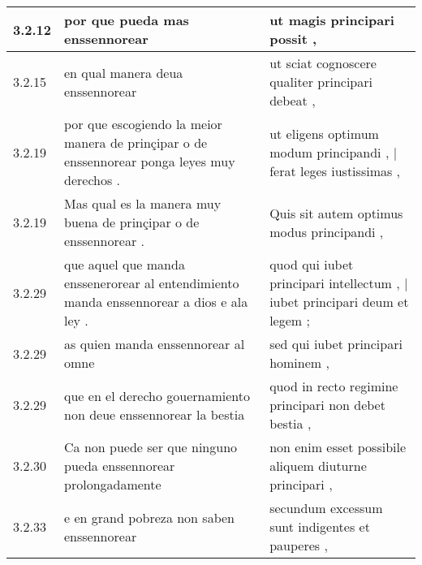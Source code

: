 \begin{tabular}{|p{1cm}|p{6.5cm}|p{6.5cm}|}
3.2.12 & por que pueda mas enssennorear & ut magis principari possit , \\\hline
3.2.15 & en qual manera deua enssennorear & ut sciat cognoscere qualiter principari debeat , \\\hline
3.2.19 & por que escogiendo la meior manera de prinçipar o de enssennorear ponga leyes muy derechos . & ut eligens optimum modum principandi , | ferat leges iustissimas , \\\hline
3.2.19 & Mas qual es la manera muy buena de prinçipar o de enssennorear . & Quis sit autem optimus modus principandi , \\\hline
3.2.29 & que aquel que manda enssenerorear al entendimiento manda enssennorear a dios e ala ley . & quod qui iubet principari intellectum , | iubet principari deum et legem ; \\\hline
3.2.29 & as quien manda enssennorear al omne & sed qui iubet principari hominem , \\\hline
3.2.29 & que en el derecho gouernamiento non deue enssennorear la bestia & quod in recto regimine principari non debet bestia , \\\hline
3.2.30 & Ca non puede ser que ninguno pueda enssennorear prolongadamente & non enim esset possibile aliquem diuturne principari , \\\hline
3.2.33 & e en grand pobreza non saben enssennorear & secundum excessum sunt indigentes et pauperes , \\\hline

\end{tabular}
